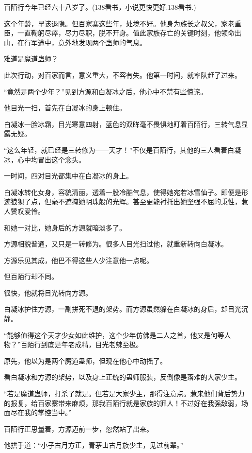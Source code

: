 
\begin{this_body}

百陌行今年已经六十八岁了。(138看书，小说更快更好.138看书.)

这个年龄，早该退隐。但百家寨这些年，处境不好。他身为族长之叔父，家老重臣，一直鞠躬尽瘁，尽力尽职，脱不开身。值此家族存亡的关键时刻，他领命出山，在行军途中，意外地发现两个蛊师的气息。

难道是魔道蛊师？

此次行动，对百家而言，意义重大，不容有失。他第一时间，就率队赶了过来。

“竟然是两个少年？”见到方源和白凝冰之后，他心中不禁有些惊诧。

他目光一扫，首先在白凝冰的身上顿住。

白凝冰一脸冰霜，目光寒意四射，蓝色的双眸毫不畏惧地盯着百陌行，三转气息显露无疑。

“这么年轻，就已经是三转修为――天才！”不仅是百陌行，其他的三人看着白凝冰，心中均冒出这个念头。

一时间，四对目光都集中在白凝冰的身上。

白凝冰转化女身，容貌清丽，透着一股冷酷气息，使得她宛若冰雪仙子。即便是形迹狼狈了点，但毫不遮掩她明珠般的光辉。甚至更能衬托出她坚强不屈的秉性，惹人赞叹爱怜。

和她一对比，她身后的方源就暗淡多了。

方源相貌普通，又只是一转修为。很多人目光扫过他，就重新转向白凝冰。

方源乐见其成，他巴不得这些人少注意他一点呢。

但百陌行却不同。

很快，他就将目光转向方源。

白凝冰护住方源，一副拼死不退的架势。而方源虽然躲在白凝冰的身后，却目光沉静。

“能够值得这个天才少女如此维护，这个少年仿佛是二人之首，他又是何等人物？”百陌行到底是年老成精，目光老辣至极。

原先，他以为是两个魔道蛊师，但现在他心中动摇了。

看白凝冰和方源的架势，以及身上正统的蛊师服装，反倒像是落难的大家少主。

“若是魔道蛊师，打杀了就是。但若是大家少主，那得注意点。惹来他们背后势力的报复，给百家寨带来麻烦，那我百陌行就是家族的罪人！不过好在我强敌弱，场面尽在我的掌控当中。”

百陌行正思量着，方源迈前一步，忽然站了出来。

他拱手道：“小子古月方正，青茅山古月族少主，见过前辈。”


\end{this_body}
